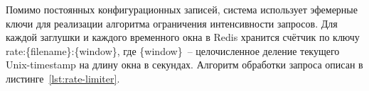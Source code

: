 









Помимо постоянных конфигурационных записей, система использует эфемерные ключи для реализации алгоритма ограничения интенсивности запросов. Для каждой заглушки и каждого временного окна в Redis хранится счётчик по ключу rate:\{filename\}:\{window\}, где \{window\}~-- целочисленное деление текущего Unix-timestamp на длину окна в секундах. Алгоритм обработки запроса описан в листинге~\ref{lst:rate-limiter}.

